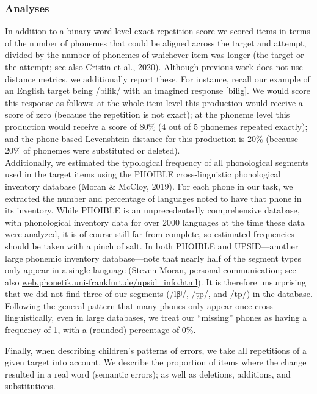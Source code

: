 \documentclass[english,,man,floatsintext]{apa6}
\begin{document}
\subsubsection{Analyses}\label{analyses}

In addition to a binary word-level exact repetition score we scored
items in terms of the number of phonemes that could be aligned across
the target and attempt, divided by the number of phonemes of whichever
item was longer (the target or the attempt; see also Cristia et al.,
2020). Although previous work does not use distance metrics, we
additionally report these. For instance, recall our example of an
English target being /bilik/ with an imagined response {[}bilig{]}. We
would score this response as follows: at the whole item level this
production would receive a score of zero (because the repetition is not
exact); at the phoneme level this production would receive a score of
80\% (4 out of 5 phonemes repeated exactly); and the phone-based
Levenshtein distance for this production is 20\% (because 20\% of
phonemes were substituted or deleted).\\

Additionally, we estimated the typological frequency of all phonological
segments used in the target items using the PHOIBLE cross-linguistic
phonological inventory database (Moran \& McCloy, 2019). For each phone
in our task, we extracted the number and percentage of languages noted
to have that phone in its inventory. While PHOIBLE is an unprecedentedly
comprehensive database, with phonological inventory data for over 2000
languages at the time these data were analyzed, it is of course still
far from complete, so estimated frequencies should be taken with a pinch
of salt. In both PHOIBLE and UPSID---another large phonemic inventory
database---note that nearly half of the segment types only appear in a
single language (Steven Moran, personal communication; see also
\href{http://web.phonetik.uni-frankfurt.de/upsid_info.html}{web.phonetik.uni-frankfurt.de/upsid\_info.html}).
It is therefore unsurprising that we did not find three of our segments
(/lβʲ/, /ṭp/, and /tp/) in the database. Following the general pattern
that many phones only appear once cross-linguistically, even in large
databases, we treat our ``missing'' phones as having a frequency of 1,
with a (rounded) percentage of 0\%.

Finally, when describing children's patterns of errors, we take all
repetitions of a given target into account. We describe the proportion
of items where the change resulted in a real word (semantic errors); as
well as deletions, additions, and substitutions.
\end{document}
